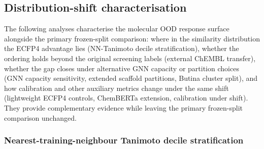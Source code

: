 \documentclass[11pt,a4paper]{article}
\begin{document}
\subsection{Distribution-shift characterisation}

The following analyses characterise the molecular OOD response surface alongside the primary frozen-split comparison: where in the similarity distribution the ECFP4 advantage lies (NN-Tanimoto decile stratification), whether the ordering holds beyond the original screening labels (external ChEMBL transfer), whether the gap closes under alternative GNN capacity or partition choices (GNN capacity sensitivity, extended scaffold partitions, Butina cluster split), and how calibration and other auxiliary metrics change under the same shift (lightweight ECFP4 controls, ChemBERTa extension, calibration under shift). They provide complementary evidence while leaving the primary frozen-split comparison unchanged.

\subsubsection{Nearest-training-neighbour Tanimoto decile stratification}
\label{sec:nn-deciles-ref}
\end{document}
